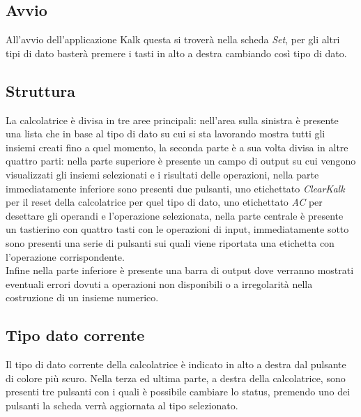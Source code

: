 \documentclass[a4paper,10pt]{article}
\begin{document}
            \subsection{Avvio}
            All’avvio dell’applicazione Kalk questa si troverà nella scheda \textit{Set}, per gli altri tipi di dato basterà premere i tasti in alto a destra cambiando così tipo di dato.
            \subsection{Struttura}
            La calcolatrice è divisa in tre aree principali: nell’area sulla sinistra è presente una lista che in base al tipo di dato su cui si sta lavorando mostra tutti gli insiemi creati fino a quel momento, la seconda parte è a sua volta divisa in altre quattro parti: nella parte superiore è presente un campo di output su cui vengono visualizzati gli insiemi selezionati e i risultati delle operazioni, nella parte immediatamente inferiore sono presenti due pulsanti, uno etichettato \textit{ClearKalk} per il reset della calcolatrice per quel tipo di dato, uno etichettato \textit{AC} per desettare gli operandi e l'operazione selezionata, nella parte centrale è presente un tastierino con quattro tasti con le operazioni di input, immediatamente sotto sono presenti una serie di pulsanti sui quali viene riportata una etichetta con l’operazione corrispondente.\\
            Infine nella parte inferiore è presente una barra di output dove verranno mostrati eventuali errori dovuti a operazioni non disponibili o a irregolarità nella costruzione di un insieme numerico.
            \subsection{Tipo dato corrente}
            Il tipo di dato corrente della calcolatrice è indicato in alto a destra dal pulsante di colore più scuro.
            Nella terza ed ultima parte, a destra della calcolatrice, sono presenti tre pulsanti con i quali è possibile cambiare lo status, premendo uno dei pulsanti la scheda verrà aggiornata al tipo selezionato. 
\end{document}
